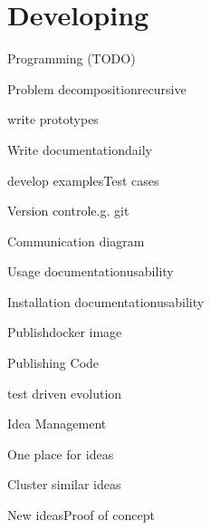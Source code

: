
\section{Developing}
\begin{checklist}{Programming (TODO)}
  \item{Problem decomposition}{recursive}
  \item{write prototypes}{}
  \item{Write documentation}{daily}
  \item{develop examples}{Test cases}
  \item{Version control}{e.g. git}
  \item{Communication diagram}{}
  \item{Usage documentation}{usability}
  \item{Installation documentation}{usability}
  \item{Publish}{docker image}
\end{checklist}

\begin{checklist}{Publishing Code}
\item{}{}
\item{}{test driven evolution}
\end{checklist}

\begin{checklist}{Idea Management}
\item{One place for ideas}{}
\item{Cluster similar ideas}{}
\item{New ideas}{Proof of concept}
\end{checklist}


